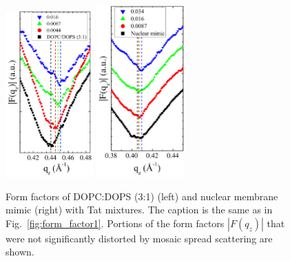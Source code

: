 \begin{figure}[htbp]
  \centering
  \includegraphics[width=0.3\textwidth]{figures/Tat/NFIT_results/DOPCDOPS3to1_form_factors}
  \qquad  
  \includegraphics[width=0.3\textwidth]{figures/Tat/NFIT_results/nuclear_form_factors}
  \caption{Form factors of DOPC:DOPS (3:1) (left) and nuclear membrane mimic 
  (right) with Tat mixtures.
  The caption is the same as in Fig.~\ref{fig:form_factor1}.
  Portions of the form factors $|F(q_z)|$ that were not significantly distorted 
  by mosaic spread scattering are shown.}
  \label{fig:form_factor4}
\end{figure}



\newpage
